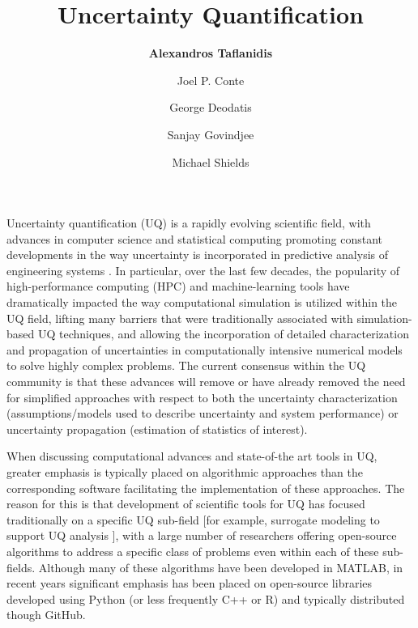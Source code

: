 %
%
%


\title{Uncertainty Quantification}
\author{
    \textbf{Alexandros Taflanidis}
    \and Joel P. Conte
    \and George Deodatis
    \and Sanjay Govindjee
    \and Michael Shields}
\tocauthor{}
%
%
\maketitle
\label{chapter:uq}

Uncertainty quantification (UQ) is a rapidly evolving scientific field, with advances in computer science and statistical computing promoting constant developments in the way uncertainty is incorporated in predictive analysis of engineering systems \citep{smith2013uncertainty}. In particular, over the last few decades, the popularity of high-performance computing (HPC) and machine-learning tools have dramatically impacted the way computational simulation is utilized within the UQ field, lifting many barriers that were traditionally associated with simulation-based UQ techniques, and allowing the incorporation of detailed characterization and propagation of uncertainties in computationally intensive numerical models to solve highly complex problems. The current consensus within the UQ community is that these advances will remove or have already removed the need for simplified approaches with respect to both the uncertainty characterization (assumptions/models used to describe uncertainty and system performance) or uncertainty propagation (estimation of statistics of interest). 

When discussing computational advances and state-of-the art tools in UQ, greater emphasis is typically placed on algorithmic approaches than the corresponding software facilitating the implementation of these approaches. The reason for this is that development of scientific tools for UQ has focused traditionally on a specific UQ sub-field [for example, surrogate modeling to support UQ analysis \citep{lophaven2002dacea, gorissen2010surrogate}], with a large number of researchers \citep[e.g.,][]{bect2017bayesian, clement2018methods} offering open-source algorithms to address a specific class of problems even within each of these sub-fields. Although many of these algorithms have been developed in MATLAB, in recent years significant emphasis has been placed on open-source libraries developed using Python (or less frequently C++ or R) and typically distributed though GitHub.    

